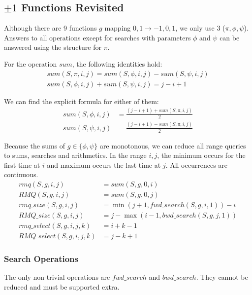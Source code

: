 \subsection{$\pm 1$ Functions Revisited}

Although there are 9 functions $g$ mapping ${0, 1} \to {-1, 0, 1}$, we only use 3 ($\pi, \phi, \psi$).
Answers to all operations except for searches with parameters $\phi$ and $\psi$ can be answered using the structure for $\pi$.

For the operation $sum$, the following identities hold:
\begin{gather*}
	sum(S, \pi, i, j) = sum(S, \phi, i, j) - sum(S, \psi, i, j) \\
	sum(S, \phi, i, j) + sum(S, \psi, i, j) = j - i + 1
\end{gather*}

We can find the explicit formula for either of them:
\begin{align*}
	sum(S, \phi, i, j) &= \frac{(j - i + 1) + sum(S, \pi, i, j)}{2} \\
	sum(S, \psi, i, j) &= \frac{(j - i + 1) - sum(S, \pi, i, j)}{2}
\end{align*}

Because the sums of $g \in \{\phi, \psi \}$ are monotonous, we can reduce all range queries to sums, searches and arithmetics.
In the range $i, j$, the minimum occurs for the first time at $i$ and maximum occurs the last time at $j$.
All occurrences are continuous.
\begin{align*}
	rmq(S, g, i, j) &= sum(S, g, 0, i) \\
	RMQ(S, g, i, j) &= sum(S, g, 0, j) \\
	rmq\_size(S, g, i, j) &= \min(j + 1, fwd\_search(S, g, i, 1)) - i \\
	RMQ\_size(S, g, i, j) &= j - \max(i - 1, bwd\_search(S, g, j, 1)) \\
	rmq\_select(S, g, i, j, k) &= i + k - 1 \\ 
	RMQ\_select(S, g, i, j, k) &= j - k + 1
\end{align*}

\subsubsection{Search Operations}

The only non-trivial operations are $fwd\_search$ and $bwd\_search$.
They cannot be reduced and must be supported extra.


